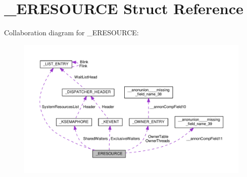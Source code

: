 \hypertarget{struct__ERESOURCE}{}\section{\+\_\+\+E\+R\+E\+S\+O\+U\+R\+C\+E Struct Reference}
\label{struct__ERESOURCE}


Collaboration diagram for \+\_\+\+E\+R\+E\+S\+O\+U\+R\+C\+E\+:
\nopagebreak
\begin{figure}[H]
\begin{center}
\leavevmode
\includegraphics[width=350pt]{struct__ERESOURCE__coll__graph}
\end{center}
\end{figure}
